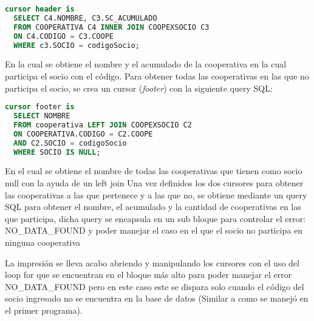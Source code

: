 \documentclass{article}
\begin{document}
\begin{lstlisting}[language=SQL]
cursor header is
  SELECT C4.NOMBRE, C3.SC_ACUMULADO
  FROM COOPERATIVA C4 INNER JOIN COOPEXSOCIO C3 
  ON C4.CODIGO = C3.COOPE
  WHERE c3.SOCIO = codigoSocio;
\end{lstlisting}
En la cual se obtiene el nombre y el acumulado de la cooperativa en la cual participa el socio con el código.
Para obtener todas las cooperativas en las que no participa el socio, se crea un cursor (\emph{footer}) con la siguiente query SQL: 
\begin{lstlisting}[language=SQL]
cursor footer is
  SELECT NOMBRE
  FROM cooperativa LEFT JOIN COOPEXSOCIO C2 
  ON COOPERATIVA.CODIGO = C2.COOPE 
  AND C2.SOCIO = codigoSocio
  WHERE SOCIO IS NULL;
\end{lstlisting}
En el cual se obtiene el nombre de todas las cooperativas que tienen como socio null con la ayuda de un left join
Una vez definidos los dos cursores para obtener las cooperativas a las que pertenece y a las que no, se obtiene mediante un query SQL para obtener el nombre, el acumulado y la cantidad de cooperativas en las que participa, dicha query se encapsula en un sub bloque para controlar el error: NO\_DATA\_FOUND y poder manejar el caso en el que el socio no participa en ninguna cooperativa

La impresión se lleva acabo abriendo y manipulando los cursores con el uso del loop for que se encuentran en el bloque más alto para poder manejar el error NO\_DATA\_FOUND pero en este caso este se dispara solo cuando el código del socio ingresado no se encuentra en la base de datos (Similar a como se manejó en el primer programa).
\end{document}
